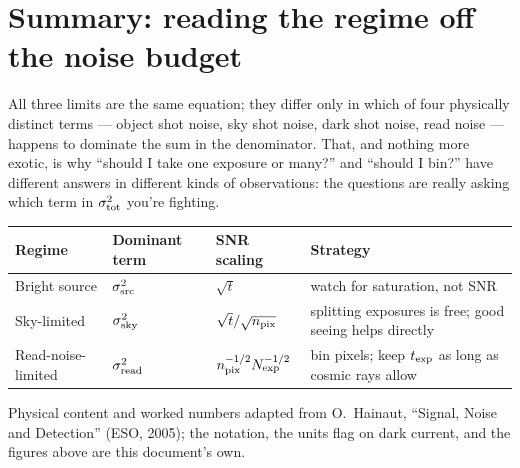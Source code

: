 \documentclass[11pt]{article}
\begin{document}
\FloatBarrier
\section*{Summary: reading the regime off the noise budget}

All three limits are the same equation; they differ only in which of four physically distinct terms
--- object shot noise, sky shot noise, dark shot noise, read noise --- happens to dominate the sum in
the denominator. That, and nothing more exotic, is why ``should I take one exposure or many?'' and
``should I bin?'' have different answers in different kinds of observations: the questions are really
asking which term in $\sigma_{\rm tot}^2$ you're fighting.

\begin{center}
\begin{tabular}{@{}l l l p{5.4cm}@{}}
\toprule
\textbf{Regime} & \textbf{Dominant term} & \textbf{SNR scaling} & \textbf{Strategy} \\
\midrule
Bright source & $\sigma_{\rm src}^2$ & $\sqrt{t}$ & watch for saturation, not SNR \\
Sky-limited & $\sigma_{\rm sky}^2$ & $\sqrt{t}/\sqrt{n_{\rm pix}}$ & splitting exposures is free; good seeing helps directly \\
Read-noise-limited & $\sigma_{\rm read}^2$ & $n_{\rm pix}^{-1/2}N_{\rm exp}^{-1/2}$ & bin pixels; keep $t_{\rm exp}$ as long as cosmic rays allow \\
\bottomrule
\end{tabular}
\end{center}

\vspace{18pt}
{\footnotesize\color{muted}
Physical content and worked numbers adapted from O.\ Hainaut, ``Signal, Noise and Detection'' (ESO,
2005); the notation, the units flag on dark current, and the figures above are this document's own.\par}
\end{document}
